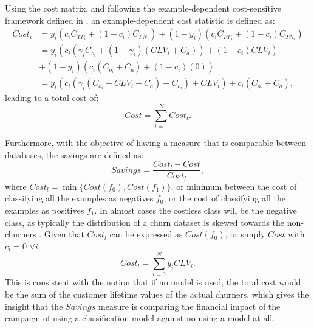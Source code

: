   	Using the cost matrix, and following the example-dependent cost-sensitive framework defined in 
\citep{CorreaBahnsen2014b}, an example-dependent cost statistic is defined as:
	\begin{align}\label{eq:cost_i}
		Cost_i &= y_i(c_i C_{TP_i} + (1-c_i)C_{FN_i}) + (1-y_i)(c_i C_{FP_i} + 
(1-c_i)C_{TN_i}) \nonumber \\
	 &=y_i(c_i (\gamma_iC_{o_i}+(1-\gamma_i)(CLV_i+C_a)) + (1-c_i)CLV_i) \nonumber \\
	 &+  (1-y_i)(c_i (C_{o_i}+C_a) + (1-c_i)(0)) \nonumber \\
	 &= y_i(c_i\left(\gamma_i(C_{o_i}-CLV_i-C_a)-C_{o_i}\right)+CLV_i)+c_i(C_{o_i}+C_a),
	\end{align}
	leading to a total cost of:
	\begin{equation}\label{eq:cost}
	 	 Cost = \sum_{i=1}^N Cost_i.
	\end{equation}


	Furthermore, with the objective of having a measure that is comparable between databases, the 
savings are defined as:
	\begin{equation}\label{eq:savings}
	  Savings = \frac{Cost_l - Cost}{Cost_l},
	\end{equation} 
	where \mbox{$Cost_l = \min \{Cost(f_0), Cost(f_1)\}$}, or minimum between the cost of 
classifying all the examples as negatives $f_0$, or the cost of classifying all the examples as 
positives $f_1$. In almost cases the costless class will be the negative class, as typically the 
distribution of a churn dataset is skewed towards the non-churners \citep{Verbeke2012}. Given that 
$Cost_l$ can be expressed as $Cost(f_0)$, or simply $Cost$ with $c_i=0$ $\forall i$:
\begin{equation}
 Cost_l = \sum_{i=0}^{N} y_i CLV_i.
\end{equation}
This is consistent with the notion that if no model is used, the total cost would be the 
sum of the customer lifetime values of the actual churners, which gives the insight 
that the $Savings$ measure is comparing the financial impact of the campaign of using a 
classification model against no using a model at all.

